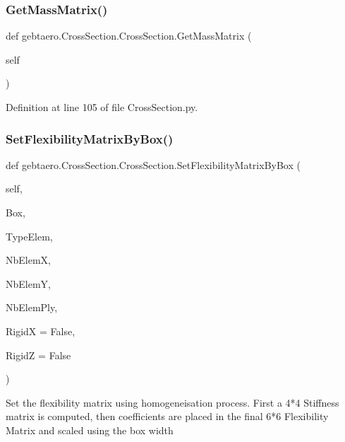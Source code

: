 \subsubsection{\texorpdfstring{Get\+Mass\+Matrix()}{GetMassMatrix()}}
{\footnotesize\ttfamily def gebtaero.\+Cross\+Section.\+Cross\+Section.\+Get\+Mass\+Matrix (\begin{DoxyParamCaption}\item[{}]{self }\end{DoxyParamCaption})}



Definition at line 105 of file Cross\+Section.\+py.

\mbox{\label{classgebtaero_1_1_cross_section_1_1_cross_section_a1dc9bde378c556e404c167dfaeda0806}} 
\subsubsection{\texorpdfstring{Set\+Flexibility\+Matrix\+By\+Box()}{SetFlexibilityMatrixByBox()}}
{\footnotesize\ttfamily def gebtaero.\+Cross\+Section.\+Cross\+Section.\+Set\+Flexibility\+Matrix\+By\+Box (\begin{DoxyParamCaption}\item[{}]{self,  }\item[{}]{Box,  }\item[{}]{Type\+Elem,  }\item[{}]{Nb\+ElemX,  }\item[{}]{Nb\+ElemY,  }\item[{}]{Nb\+Elem\+Ply,  }\item[{}]{RigidX = {\ttfamily False},  }\item[{}]{RigidZ = {\ttfamily False} }\end{DoxyParamCaption})}

\begin{DoxyVerb}Set the flexibility matrix using homogeneisation process.
First a 4*4 Stiffness matrix is computed, then coefficients are
placed in the final 6*6 Flexibility Matrix and scaled using the box width
\end{DoxyVerb}
 

